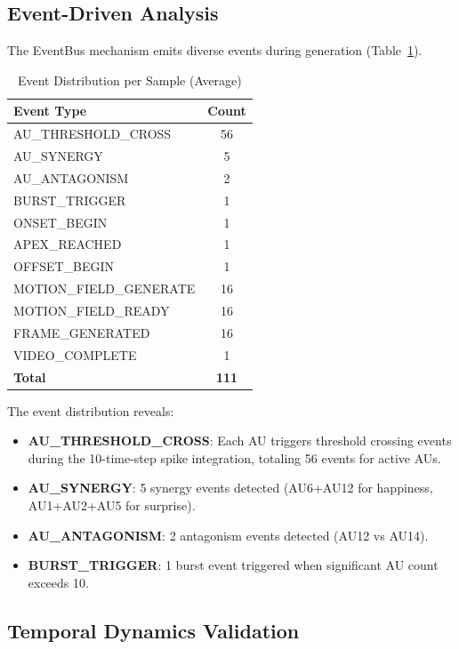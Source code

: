 \subsection{Event-Driven Analysis}

The EventBus mechanism emits diverse events during generation (Table~\ref{tab:events}).

\begin{table}[htbp]
\centering
\caption{Event Distribution per Sample (Average)}
\label{tab:events}
\begin{tabular}{lc}
\toprule
Event Type & Count \\
\midrule
AU\_THRESHOLD\_CROSS & 56 \\
AU\_SYNERGY & 5 \\
AU\_ANTAGONISM & 2 \\
BURST\_TRIGGER & 1 \\
ONSET\_BEGIN & 1 \\
APEX\_REACHED & 1 \\
OFFSET\_BEGIN & 1 \\
MOTION\_FIELD\_GENERATE & 16 \\
MOTION\_FIELD\_READY & 16 \\
FRAME\_GENERATED & 16 \\
VIDEO\_COMPLETE & 1 \\
\midrule
\textbf{Total} & \textbf{111} \\
\bottomrule
\end{tabular}
\end{table}

The event distribution reveals:
\begin{itemize}
\item \textbf{AU\_THRESHOLD\_CROSS}: Each AU triggers threshold crossing events during the 10-time-step spike integration, totaling 56 events for active AUs.
\item \textbf{AU\_SYNERGY}: 5 synergy events detected (AU6+AU12 for happiness, AU1+AU2+AU5 for surprise).
\item \textbf{AU\_ANTAGONISM}: 2 antagonism events detected (AU12 vs AU14).
\item \textbf{BURST\_TRIGGER}: 1 burst event triggered when significant AU count exceeds 10.
\end{itemize}

\subsection{Temporal Dynamics Validation}

